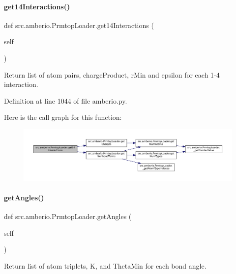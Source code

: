 \paragraph{\texorpdfstring{get14\+Interactions()}{get14Interactions()}}
{\footnotesize\ttfamily def src.\+amberio.\+Prmtop\+Loader.\+get14\+Interactions (\begin{DoxyParamCaption}\item[{}]{self }\end{DoxyParamCaption})}



Return list of atom pairs, charge\+Product, r\+Min and epsilon for each 1-\/4 interaction. 



Definition at line 1044 of file amberio.\+py.

Here is the call graph for this function\+:
\nopagebreak
\begin{figure}[H]
\begin{center}
\leavevmode
\includegraphics[width=350pt]{classsrc_1_1amberio_1_1PrmtopLoader_a854cac838bde307ba4c069ba58b71cb6_cgraph}
\end{center}
\end{figure}
\mbox{\label{classsrc_1_1amberio_1_1PrmtopLoader_a1dd2758d21107eae79a1766e55c33708}} 
\paragraph{\texorpdfstring{get\+Angles()}{getAngles()}}
{\footnotesize\ttfamily def src.\+amberio.\+Prmtop\+Loader.\+get\+Angles (\begin{DoxyParamCaption}\item[{}]{self }\end{DoxyParamCaption})}



Return list of atom triplets, K, and Theta\+Min for each bond angle. 



